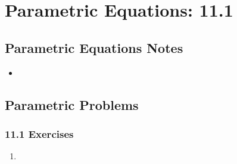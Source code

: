 \chapter{Parametric Equations: 11.1}

\section{Parametric Equations Notes}
\begin{itemize}
  \item
\end{itemize}

\section{Parametric Problems}
\subsection{11.1 Exercises}
\begin{enumerate}[itemsep=3em]
  \item
\end{enumerate}
